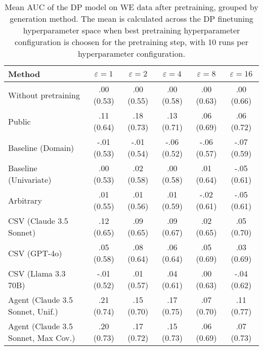 \begin{table}[h!]
    \centering
    \caption{Mean AUC of the DP model on WE data after pretraining, grouped by generation method. The mean is calculated across the DP finetuning hyperparameter space when best pretraining hyperparameter configuration is choosen for the pretraining step, with 10 runs per hyperparameter configuration.}
    \label{tab:epsilon_comparison}
    \begin{tabular}{lccccc}
    \toprule
    Method & $\varepsilon=1$ & $\varepsilon=2$ & $\varepsilon=4$ & $\varepsilon=8$ & $\varepsilon=16$ \\
    \midrule
    Without pretraining & .00 {\small (0.53)} & .00 {\small (0.55)} & .00 {\small (0.58)} & .00 {\small (0.63)} & .00 {\small (0.66)} \\
    \arrayrulecolor{black!50!}\midrule
    Public & .11 {\small (0.64)} & \cellcolor{gold!30}.18 {\small (0.73)} & .13 {\small (0.71)} & \cellcolor{bronze!30}.06 {\small (0.69)} & .06 {\small (0.72)} \\
    \arrayrulecolor{black!50!}\midrule
    Baseline (Domain) & -.01 {\small (0.53)} & -.01 {\small (0.54)} & -.06 {\small (0.52)} & -.06 {\small (0.57)} & -.07 {\small (0.59)} \\
    Baseline (Univariate) & .00 {\small (0.53)} & .02 {\small (0.58)} & .00 {\small (0.58)} & .01 {\small (0.64)} & -.05 {\small (0.61)} \\
    \arrayrulecolor{black!50!}\midrule
    Arbitrary & .01 {\small (0.55)} & .01 {\small (0.56)} & .01 {\small (0.59)} & -.02 {\small (0.61)} & -.05 {\small (0.61)} \\
    \arrayrulecolor{black!50!}\midrule
    CSV (Claude 3.5 Sonnet) & \cellcolor{bronze!30}.12 {\small (0.65)} & .09 {\small (0.65)} & .09 {\small (0.67)} & .02 {\small (0.65)} & .05 {\small (0.70)} \\
    CSV (GPT-4o) & .05 {\small (0.58)} & .08 {\small (0.64)} & .06 {\small (0.64)} & .05 {\small (0.69)} & .03 {\small (0.69)} \\
    CSV (Llama 3.3 70B) & -.01 {\small (0.52)} & .01 {\small (0.57)} & .04 {\small (0.61)} & .00 {\small (0.63)} & -.04 {\small (0.62)} \\
    \arrayrulecolor{black!50!}\midrule
    Agent (Claude 3.5 Sonnet, Unif.) & \cellcolor{gold!30}.21 {\small (0.74)} & .15 {\small (0.70)} & \cellcolor{gold!30}.17 {\small (0.75)} & \cellcolor{silver!30}.07 {\small (0.70)} & \cellcolor{gold!30}.11 {\small (0.77)} \\
    Agent (Claude 3.5 Sonnet, Max Cov.) & \cellcolor{silver!30}.20 {\small (0.73)} & \cellcolor{silver!30}.17 {\small (0.72)} & \cellcolor{silver!30}.15 {\small (0.73)} & .06 {\small (0.69)} & \cellcolor{bronze!30}.07 {\small (0.73)} \\

\end{tabular}
\end{table}
